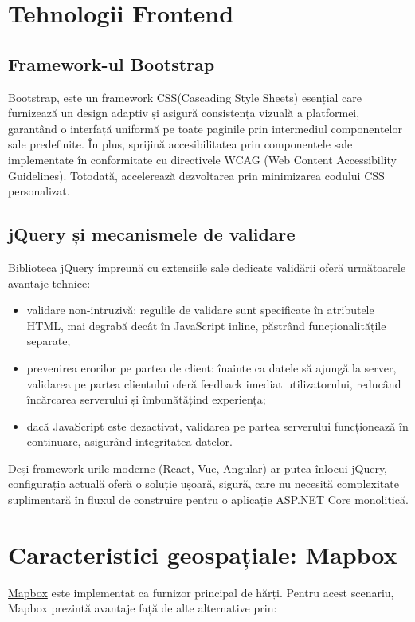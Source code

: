 \section{Tehnologii Frontend}
\subsection{Framework-ul Bootstrap}
Bootstrap, este un framework CSS(Cascading Style Sheets) esențial care furnizează un design adaptiv și asigură consistența vizuală a platformei, garantând o interfață uniformă pe toate paginile prin intermediul componentelor sale predefinite. În plus, sprijină accesibilitatea prin componentele sale implementate în conformitate cu directivele WCAG (Web Content Accessibility Guidelines). Totodată, accelerează dezvoltarea prin minimizarea codului CSS personalizat.

\subsection{jQuery și mecanismele de validare}
Biblioteca jQuery împreună cu extensiile sale dedicate validării oferă următoarele avantaje tehnice:
\begin{itemize}
    \item  validare non-intruzivă: regulile de validare sunt specificate în atributele HTML, mai degrabă decât în JavaScript inline, păstrând funcționalitățile separate;
    \item  prevenirea erorilor pe partea de client: înainte ca datele să ajungă la server, validarea pe partea clientului oferă feedback imediat utilizatorului, reducând încărcarea serverului și îmbunătățind experiența;
    \item  dacă JavaScript este dezactivat, validarea pe partea serverului funcționează în continuare, asigurând integritatea datelor.
\end{itemize}

Deși framework-urile moderne (React, Vue, Angular) ar putea înlocui jQuery, configurația actuală oferă o soluție ușoară, sigură, care nu necesită complexitate suplimentară în fluxul de construire pentru o aplicație ASP.NET Core monolitică.

\section{Caracteristici geospațiale: Mapbox}
\href{https://link.springer.com/chapter/10.1007/978-3-031-19594-5_2}{Mapbox}\cite{mapbox_ref} este implementat ca furnizor principal de hărți. Pentru acest scenariu, Mapbox prezintă avantaje față de alte alternative prin:

